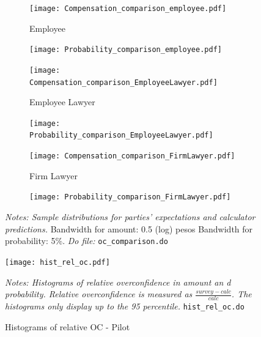 \documentclass[11pt]{article}
\begin{document}
\begin{figure}[H]
    \caption{Parties' expectations and calculator predictions. - Pilot}
    \label{figlabel}
    \begin{center}
    \begin{subfigure}{0.49\textwidth}
        \caption{Employee}
        \centering
        \texttt{[image: Compensation\_comparison\_employee.pdf]}
    \end{subfigure}
     \begin{subfigure}{0.49\textwidth}
        \centering
        \texttt{[image: Probability\_comparison\_employee.pdf]}
    \end{subfigure}
    \begin{subfigure}{0.49\textwidth}
        \caption{Employee Lawyer}
        \centering
        \texttt{[image: Compensation\_comparison\_EmployeeLawyer.pdf]}
        \end{subfigure}
          \begin{subfigure}{0.49\textwidth}
        \centering
        \texttt{[image: Probability\_comparison\_EmployeeLawyer.pdf]}
    \end{subfigure}
        \begin{subfigure}{0.49\textwidth}
            \caption{Firm Lawyer}
            \centering
            \texttt{[image: Compensation\_comparison\_FirmLawyer.pdf]}
    \end{subfigure}
    \begin{subfigure}{0.49\textwidth}
            \centering
            \texttt{[image: Probability\_comparison\_FirmLawyer.pdf]}
        \end{subfigure}
    \end{center}
     \footnotesize \textit{Notes: Sample distributions for parties' expectations and calculator predictions.} Bandwidth for amount: 0.5 (log) pesos  Bandwidth for probability: 5\%. 
      \footnotesize{ \textit{Do file: }  \texttt{oc\_comparison.do}}
\end{figure}





\begin{figure}[H]
    \caption{Histograms of relative OC - Pilot}
    \label{hist_rel_oc}
    \begin{center}
        \texttt{[image: hist\_rel\_oc.pdf]}
        \end{center}
        {\footnotesize \textit{Notes: Histograms of relative overconfidence in amount an d probability. Relative overconfidence is measured as $\frac{survey-calc}{calc}$. The histograms only display up to the 95 percentile.}}
        \texttt{hist\_rel\_oc.do}
\end{figure}
\end{document}
